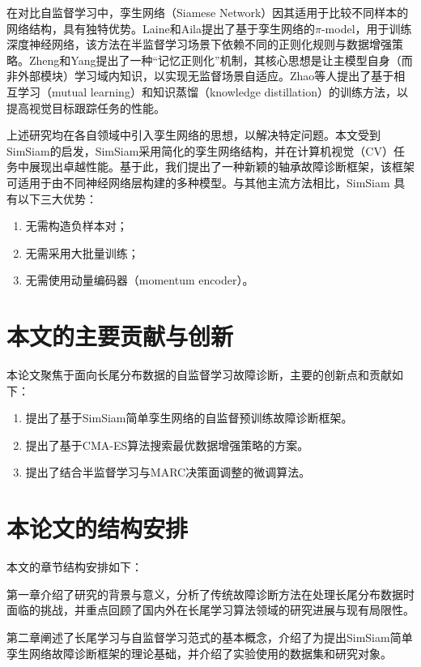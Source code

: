 \documentclass[master]{thesis-uestc}
\begin{document}
在对比自监督学习中，孪生网络（Siamese Network）因其适用于比较不同样本的网络结构，具有独特优势。Laine和Aila提出了基于孪生网络的$\pi$-model，用于训练深度神经网络，该方法在半监督学习场景下依赖不同的正则化规则与数据增强策略。Zheng和Yang提出了一种“记忆正则化”机制，其核心思想是让主模型自身（而非外部模块）学习域内知识，以实现无监督场景自适应。Zhao等人提出了基于相互学习（mutual learning）和知识蒸馏（knowledge distillation）的训练方法，以提高视觉目标跟踪任务的性能。

上述研究均在各自领域中引入孪生网络的思想，以解决特定问题。本文受到SimSiam的启发，SimSiam采用简化的孪生网络结构，并在计算机视觉（CV）任务中展现出卓越性能。基于此，我们提出了一种新颖的轴承故障诊断框架，该框架可适用于由不同神经网络层构建的多种模型。与其他主流方法相比，SimSiam 具有以下三大优势：
\begin{enumerate}
    \item 无需构造负样本对；
    \item 无需采用大批量训练；
    \item 无需使用动量编码器（momentum encoder）。
\end{enumerate}


\section{本文的主要贡献与创新}

本论文聚焦于面向长尾分布数据的自监督学习故障诊断，主要的创新点和贡献如下：

\begin{enumerate}
    \item 提出了基于SimSiam简单孪生网络的自监督预训练故障诊断框架。
    \item 提出了基于CMA-ES算法搜索最优数据增强策略的方案。
    \item 提出了结合半监督学习与MARC决策面调整的微调算法。
\end{enumerate}

\section{本论文的结构安排}

本文的章节结构安排如下：

第一章介绍了研究的背景与意义，分析了传统故障诊断方法在处理长尾分布数据时面临的挑战，并重点回顾了国内外在长尾学习算法领域的研究进展与现有局限性。

第二章阐述了长尾学习与自监督学习范式的基本概念，介绍了为提出SimSiam简单孪生网络故障诊断框架的理论基础，并介绍了实验使用的数据集和研究对象。
\end{document}
